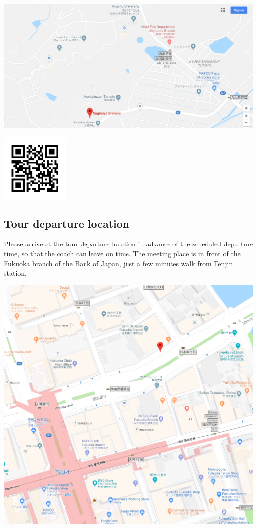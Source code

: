 \noindent\includegraphics[width=\textwidth]{suginoya.png}

\includegraphics[width=0.25\textwidth]{suginoya_qr.png}

\newpage
\subsection*{Tour departure location}

Please arrive at the tour departure location in advance of the scheduled departure time, so that the
coach can leave on time.   
The meeting place is in front of the Fukuoka branch of the Bank of Japan, just a few minutes walk from Tenjin station.

\noindent\includegraphics[width=\textwidth]{tour_meeting_place.png}


